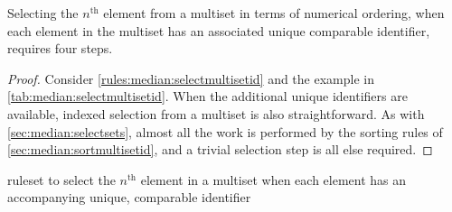 \begin{proposition}\label{prop:median:selectmultisetid}
Selecting the \(n^{\text{th}}\) element from a multiset in terms of numerical ordering, when each element in the multiset has an associated unique comparable identifier, requires four steps.
\end{proposition}

\begin{proof}
Consider \cref{rules:median:selectmultisetid} and the example in \cref{tab:median:selectmultisetid}.  When the additional unique identifiers are available, indexed selection from a multiset is also straightforward. As with \cref{sec:median:selectsets}, almost all the work is performed by the sorting rules of \cref{sec:median:sortmultisetid}, and a trivial selection step is all else required.
\end{proof}

\begin{cprulesetfloat} \begin{cpruleset}



\end{cpruleset}
\caption{\label{rules:median:selectmultisetid}\Gls{ruleset} to select the \(n^{\text{th}}\) element in a multiset when each element has an accompanying unique, comparable identifier}
\end{cprulesetfloat}

